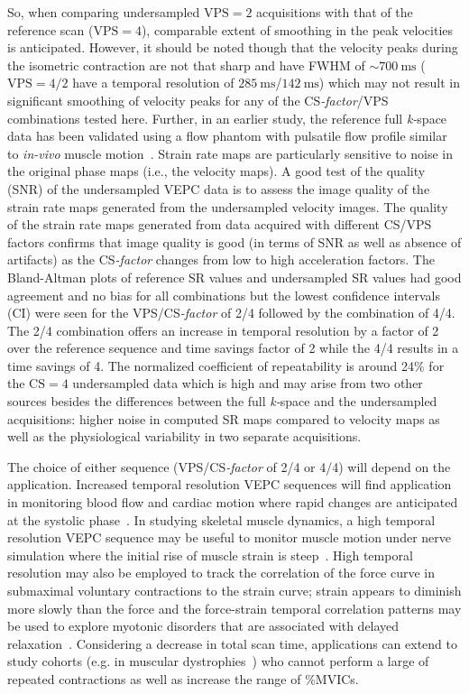 So, when comparing undersampled $\mathrm{VPS} = 2$ acquisitions with that of the reference scan ($\mathrm{VPS} = 4$), comparable extent of smoothing in the peak velocities is anticipated. 
However, it should be noted though that the velocity peaks during the isometric contraction are not that sharp and have FWHM of $\sim \SI{700}{\milli\second}$  ($\mathrm{VPS} = 4/2$ have a temporal resolution of $\SI{285}{\milli\second}$/$\SI{142}{\milli\second}$) which may not result in significant smoothing of velocity peaks for any of the \mbox{CS\textit{-factor}}/VPS combinations tested here. 
Further, in an earlier study, the reference full \mbox{\textit{k-}space} data has been validated using a flow phantom with pulsatile flow profile similar to \textit{in-vivo} muscle motion~\cite{RNSS10}. 
Strain rate maps are particularly sensitive to noise in the original phase maps (i.e., the velocity maps). 
A good test of the quality (SNR) of the undersampled VEPC data is to assess the image quality of the strain rate maps generated from the undersampled velocity images. 
The quality of the strain rate maps generated from data acquired with different CS/VPS factors confirms that image quality is good (in terms of SNR as well as absence of artifacts) as the \mbox{CS\textit{-factor}} changes from low to high acceleration factors. 
The Bland-Altman plots of reference SR values and undersampled SR values had good agreement and no bias for all combinations but the lowest confidence intervals (CI) were seen for the VPS/\mbox{CS\textit{-factor}} of 2/4 followed by the combination of 4/4. 
The 2/4 combination offers an increase in temporal resolution by a factor of 2 over the reference sequence and time savings factor of 2 while the 4/4 results in a time savings of 4. 
The normalized coefficient of repeatability is around 24\% for the $\mathrm{CS} = 4$ undersampled data which is high and may arise from two other sources besides the differences between the full \mbox{\textit{k-}space} and the undersampled acquisitions: higher noise in computed SR maps compared to velocity maps as well as the physiological variability in two separate acquisitions. 

The choice of either sequence (VPS/\mbox{CS\textit{-factor}} of 2/4 or 4/4) will depend on the application. 
Increased temporal resolution VEPC sequences will find application in monitoring blood flow and cardiac motion where rapid changes are anticipated at the systolic phase~\cite{RNCS9, RNCS10}. 
In studying skeletal muscle dynamics, a high temporal resolution VEPC sequence may be useful to monitor muscle motion under nerve simulation where the initial rise of muscle strain is steep~\cite{RNCS12}. 
High temporal resolution may also be employed to track the correlation of the force curve in submaximal voluntary contractions to the strain curve; strain appears to diminish more slowly than the force and the force-strain temporal correlation patterns may be used to explore myotonic disorders that are associated with delayed relaxation~\cite{RNCS12}.
Considering a decrease in total scan time, applications can extend to study cohorts (e.g. in muscular dystrophies~\cite{RNCS12}) who cannot perform a large of repeated contractions as well as increase the range of \%MVICs.

